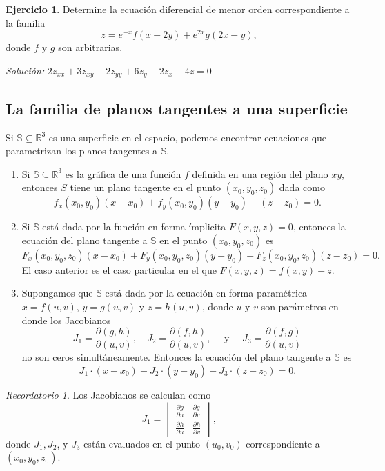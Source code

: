 \documentclass[11pt,letterpaper,draft]{report}
\theoremstyle{plain}
\theoremstyle{definition}
\newtheorem{exercise}[theorem]{Ejercicio}
\theoremstyle{remark}
\newtheorem{reminder}[theorem]{Recordatorio}
\newcommand\R{\mathbb R}
\newcommand\<{\langle}
\renewcommand\>{\rangle}
\begin{document}
\begin{exercise}
  Determine la ecuación diferencial de menor orden correspondiente a
  la familia
  \begin{equation}
    z = e^{-x}f(x+2y) + e^{2x}g(2x-y)
  ,\end{equation}
  donde \(f\) y \(g\) son arbitrarias.

  \emph{Solución:} \(2z_{xx}+3z_{xy}-2z_{yy}+6z_y-2z_x-4z=0\)
\end{exercise}

\subsection{La familia de planos tangentes a una superficie}

Si \(\mathbb S\subseteq\R^{3}\) es una superficie en el espacio,
podemos encontrar ecuaciones que parametrizan los planos tangentes a
\(\mathbb S\).
\begin{enumerate}
  \item
    Si $\mathbb S\subseteq\R^{3}$ es la gráfica de una función \(f\)
    definida en una región del plano \(xy\), entonces
    \(S\) tiene un plano tangente en el punto
    $(x_0, y_0, z_0)$ dada como
    \[
      f_x(x_0, y_0)(x-x_0) + f_y(x_0,y_0)(y-y_0) - (z - z_0)
      = 0.
    \] 
  \item Si $\mathbb{S}$ está dada por la función en forma
    ímplicita $F(x,y,z) = 0$, entonces la ecuación del plano
    tangente a $\mathbb{S}$ en el punto $(x_0,y_0,z_0)$ es
    \[
      F_x(x_0,y_0,z_0)(x-x_0) + F_y(x_0,y_0,z_0)(y-y_0) +
      F_z(x_0,y_0,z_0)(z-z_0) = 0.
    \] 
    El caso anterior es el caso particular en el que
    \(F(x,y,z)=f(x,y)-z\).
  \item Supongamos que $\mathbb{S}$ está dada por la
    ecuación en forma paramétrica $x = f(u,v)$, $y = g(u,v)$ 
    y $z = h(u,v)$, donde $u$ y $v$ son parámetros en donde
    los Jacobianos
    \[
      J_1 = \frac{\partial(g,h)}{\partial(u,v)}, \quad J_2 =
      \frac{\partial(f,h)}{\partial(u,v)}, \quad \text{ y }
      \quad J_3 = \frac{\partial(f,g)}{\partial(u,v)}
    \] no son ceros simultáneamente. Entonces la ecuación
    del plano tangente a $\mathbb{S}$ es
    \[
      J_1 \cdot (x-x_0) + J_2 \cdot (y-y_0) + J_3 \cdot
      (z-z_0) = 0.
    \] 
\end{enumerate}
\begin{reminder}
  Los Jacobianos se calculan como
  \[
    \renewcommand\arraystretch{1.5}
    J_1 = \begin{vmatrix}
      \frac{\partial g}{\partial u} & \frac{\partial
      g}{\partial v}\\
        \frac{\partial h}{\partial u} & \frac{\partial
        h}{\partial v}
    \end{vmatrix},
  \] donde $J_1, J_2$, y $J_3$ están evaluados en el punto
  $(u_0,v_0)$ correspondiente a $(x_0,y_0,z_0)$.
\end{reminder}
\end{document}
